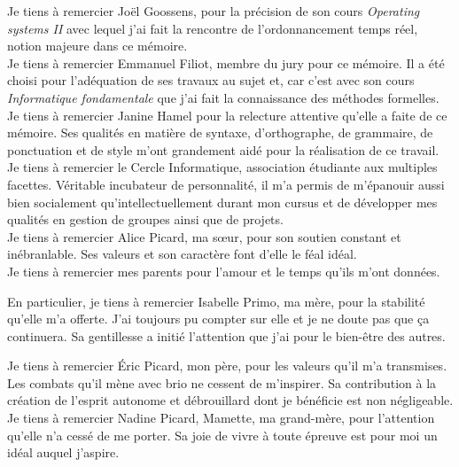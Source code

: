 \documentclass[12pt,a4paper,oneside]{book}
\theoremstyle{break}
\theoremstyle{breakplain}
\begin{document}
Je tiens à remercier Joël Goossens, pour la précision de son cours \textit{Operating systems II} avec lequel j'ai fait la rencontre de l'ordonnancement temps réel, notion majeure dans ce mémoire.\\

Je tiens à remercier Emmanuel Filiot, membre du jury pour ce mémoire. Il a été choisi pour l'adéquation de ses travaux au sujet et, car c'est avec son cours \textit{Informatique fondamentale} que j'ai fait la connaissance des méthodes formelles.\\

Je tiens à remercier Janine Hamel pour la relecture attentive qu'elle a faite de ce mémoire. Ses qualités en matière de syntaxe, d'orthographe, de grammaire, de ponctuation et de style m'ont grandement aidé pour la réalisation de ce travail.\\

Je tiens à remercier le Cercle Informatique, association étudiante aux multiples facettes. Véritable incubateur de personnalité, il m'a permis de m'épanouir aussi bien socialement qu'intellectuellement durant mon cursus et de développer mes qualités en gestion de groupes ainsi que de projets.\\

Je tiens à remercier Alice Picard, ma sœur, pour son soutien constant et inébranlable. Ses valeurs et son caractère font d'elle le féal idéal.\\

Je tiens à remercier mes parents pour l'amour et le temps qu'ils m'ont données.

En particulier, je tiens à remercier Isabelle Primo, ma mère, pour la stabilité qu'elle m'a offerte. J'ai toujours pu compter sur elle et je ne doute pas que ça continuera. Sa gentillesse a initié l'attention que j'ai pour le bien-être des autres.

Je tiens à remercier Éric Picard, mon père, pour les valeurs qu'il m'a transmises. Les combats qu'il mène avec brio ne cessent de m'inspirer. Sa contribution à la création de l'esprit autonome et débrouillard dont je bénéficie est non négligeable.\\

Je tiens à remercier Nadine Picard, Mamette, ma grand-mère, pour l'attention qu'elle n'a cessé de me porter. Sa joie de vivre à toute épreuve est pour moi un idéal auquel j'aspire.



\tableofcontents

\mainmatter
\end{document}
